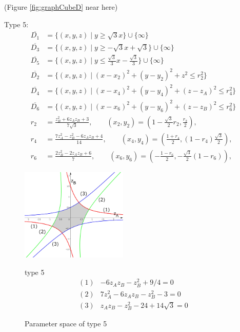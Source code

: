 \documentclass[suppldata, dvipdfmx]{interact}
\theoremstyle{plain}%
\theoremstyle{definition}
\theoremstyle{remark}
\theoremstyle{problemstyle}
\begin{document}
\noindent(Figure \ref{fig:graphCubeD} near here)
\bigskip\par
Type 5:
\begin{align*}
\overline{D_1}&=\{ (x,y,z) \mid y \ge \sqrt{3}x \} \cup \{ \infty \}\\
\overline{D_3}&=\{(x,y,z) \mid y \ge -\sqrt{3}x + \sqrt{3} \} \cup\{\infty\}\\
\overline{D_5}&=\{(x,y,z) \mid y \le \frac{\sqrt{3}}{3}x - \frac{\sqrt{3}}{3} \} \cup\{\infty\}\\
\overline{D_2}&=\{(x,y,z) \mid (x-x_2)^2+(y-y_2)^2+z^2 \le r_2^2 \} \\
\overline{D_4}&=\{(x,y,z) \mid (x-x_4)^2+(y-y_4)^2+(z-z_A)^2 \le r_4^2 \} \\
\overline{D_6}&=\{(x,y,z) \mid (x-x_6)^2+(y-y_6)^2+(z-z_B)^2 \le r_6^2 \} \\
 r_2 &= \frac{z_B^2 + 6z_Az_B + 3}{7\sqrt{3}}, \qquad
(x_2, y_2) = \left(1 - \frac{\sqrt{3}}{2}r_2, \frac{r_2}{2}\right),\\
 r_4 &= \frac{7z_A^2 - z_B^2 -6z_Az_B + 4}{14}, \qquad
(x_4, y_4) = \left(\frac{1 + r_4}{2}, (1 - r_4)\frac{\sqrt{3}}{2}\right),\\
 r_6 &= \frac{2z_B^2 - 2z_Az_B + 6}{7}, \qquad
(x_6, y_6) = \left(-\frac{1 - r_6}{2}, -\frac{\sqrt{3}}{2}(1 - r_6)\right),
\end{align*} 
\begin{figure}[h]
 \begin{minipage}[]{0.5\textwidth}
 \centering
 \includegraphics[width=2in,
 keepaspectratio]{./img/graph/cubeE.jpg}
 \caption{Parameter space of type 5}
 \label{fig:graphCubeE}
 \end{minipage}
 \hspace*{\fill}
 \begin{minipage}[]{0.5\textwidth}
  \centering
  type 5
  \begin{align*}
   (1)& -6z_Az_B - z_B^2 + 9/4 = 0\\
   (2)& 7z_A^2 - 6z_Az_B - z_B^2 - 3 = 0\\
   (3)& z_Az_B - z_B^2 - 24 + 14\sqrt{3} = 0
  \end{align*}
 \end{minipage}
 \hspace*{\fill}
\end{figure}
\end{document}
